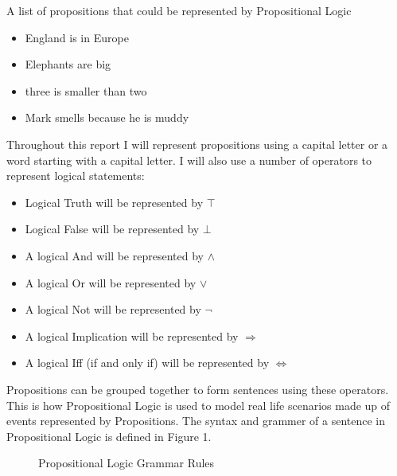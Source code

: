 \begin{exmp}A list of propositions that could be represented by Propositional Logic
\begin{itemize}
\item England is in Europe
\item Elephants are big
\item three is smaller than two
\item Mark smells because he is muddy
\end{itemize}
\end{exmp}

Throughout this report I will represent propositions using a capital letter or a word starting with a capital letter. I will also use a number of operators to represent logical statements:
\begin{itemize}
\item Logical Truth will be represented by $\top$
\item Logical False will be represented by $\bot$
\item A logical And will be represented by $\wedge$
\item A logical Or will be represented by $\vee$
\item A logical Not will be represented by $\neg$
\item A logical Implication will be represented by $\Rightarrow$
\item A logical Iff (if and only if) will be represented by $\Leftrightarrow$
\end{itemize}

Propositions can be grouped together to form sentences using these operators. This is how Propositional Logic is used to model real life scenarios made up of events represented by Propositions. The syntax and grammer of a sentence in Propositional Logic is defined in Figure 1.

\begin{figure}[!ht]
  \centering
  \caption{Propositional Logic Grammar Rules}
\end{figure}

